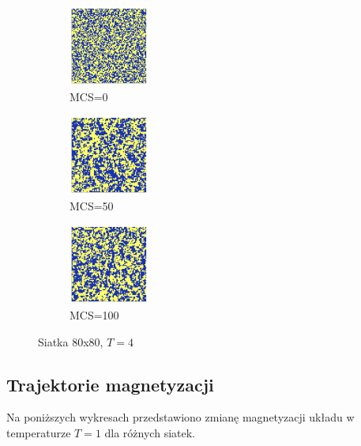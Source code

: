 \documentclass[12pt]{article}
\begin{document}
\begin{figure}[H]
  \centering

  \begin{subfigure}[b]{0.3\linewidth}
    \centering
    \includegraphics[width=100px, height=100px]{../data/snaps/snap80_temp4.0_moment1.png}
    \caption{MCS=0}
    \label{fig:image1}
  \end{subfigure}
  \hfill
  \begin{subfigure}[b]{0.3\linewidth}
    \centering
    \includegraphics[width=100px, height=100px]{../data/snaps/snap80_temp4.0_moment50.png}
    \caption{MCS=50}
    \label{fig:image2}
  \end{subfigure}
  \hfill
  \begin{subfigure}[b]{0.3\linewidth}
    \centering
    \includegraphics[width=100px, height=100px]{../data/snaps/snap80_temp4.0_moment100.png}
    \caption{MCS=100}
    \label{fig:image3}
  \end{subfigure}

  \caption{Siatka $80$x$80$, $T=4$}
  \label{fig:series}
\end{figure}


\subsection{Trajektorie magnetyzacji}

Na poniższych wykresach przedstawiono zmianę magnetyzacji układu w temperaturze $T=1$ dla różnych siatek. 
\end{document}
